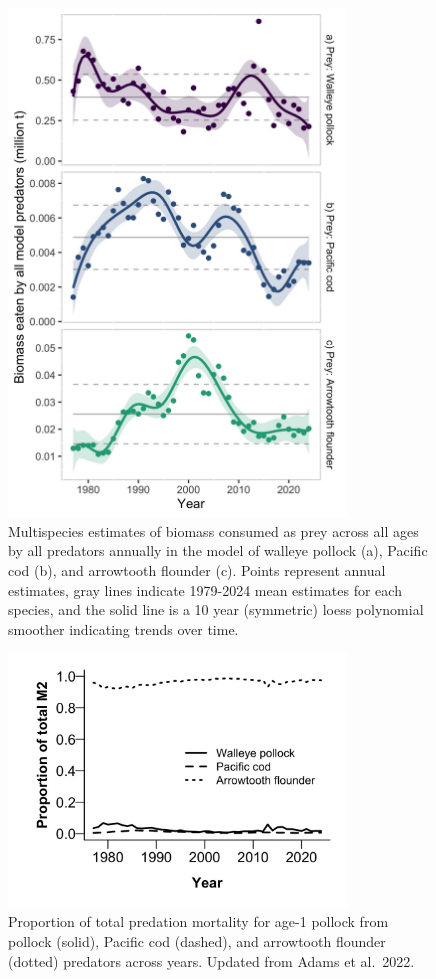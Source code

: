 \documentclass[
]{article}
\begin{document}
\begin{figure}
\centering
\includegraphics[width=0.8\textwidth,height=\textheight]{Results/ESR_Fig2.jpg}
\caption{Multispecies estimates of biomass consumed as prey across all
ages by all predators annually in the model of walleye pollock (a),
Pacific cod (b), and arrowtooth flounder (c). Points represent annual
estimates, gray lines indicate 1979-2024 mean estimates for each
species, and the solid line is a 10 year (symmetric) loess polynomial
smoother indicating trends over time.}
\end{figure}

\begin{figure}
\centering
\includegraphics[width=0.8\textwidth,height=\textheight]{Results/ESR_Fig3.jpg}
\caption{Proportion of total predation mortality for age-1 pollock from
pollock (solid), Pacific cod (dashed), and arrowtooth flounder (dotted)
predators across years. Updated from Adams et al.~2022.}
\end{figure}
\end{document}

